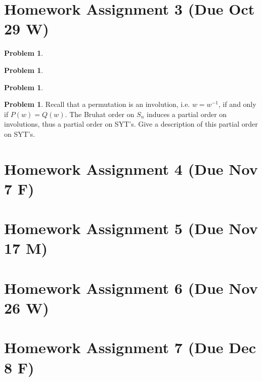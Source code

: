 \documentclass{amsart}
\theoremstyle{plain}
\theoremstyle{definition}
\newtheorem{problem}[theorem]{Problem}
\begin{document}
	
	\section{Homework Assignment 3 (Due Oct 29 W)}
	\begin{problem}
	
\end{problem}
\begin{problem}
	
\end{problem}
\begin{problem}
	
\end{problem}

\begin{problem}
	Recall that a permutation is an involution, i.e. $w=w^{-1}$, if and only if $P(w)=Q(w)$. The Bruhat order on $S_n$ induces a partial order on involutions, thus a partial order on SYT's. Give a description of this partial order on SYT's.
\end{problem}
	\section{Homework Assignment 4 (Due Nov 7 F)}
	\section{Homework Assignment 5 (Due Nov 17 M)}
	\section{Homework Assignment 6 (Due Nov 26 W)}
	\section{Homework Assignment 7 (Due Dec 8 F)}


	
	
	
	
	
	
	
	
\end{document}
